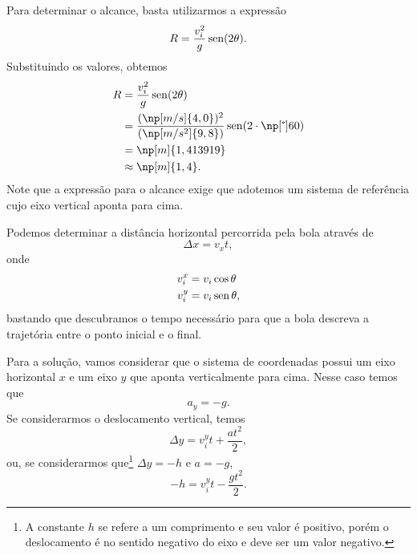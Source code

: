 Para determinar o alcance, basta utilizarmos a expressão
\begin{equation}
    R = \frac{v_i^2}{g} \operatorname{sen}(2\theta).
\end{equation}
%
Substituindo os valores, obtemos
\begin{align}
    R &= \frac{v_i^2}{g} \sen(2\theta) \\
    &= \frac{(\np[m/s]{4,0})^2}{(\np[m/s^2]{9,8})} \sen(2 \cdot \degree{60}) \\
    &= \np[m]{1,413919} \\
    &\approx \np[m]{1,4}.
\end{align}
%
Note que a expressão para o alcance exige que adotemos um sistema de referência cujo eixo vertical aponta para cima.

Podemos determinar a distância horizontal percorrida pela bola através de
\begin{equation}
	\Delta x = v_x t,
\end{equation}
%
onde
\begin{align}
	v_{i}^{x} &= v_i \cos\theta \label{Eq:VelocidadeXExemploLancamentoBola} \\
	v_{i}^{y} &= v_i \operatorname{sen}\theta,
\end{align}
%
bastando que descubramos o tempo necessário para que a bola descreva a trajetória entre o ponto inicial e o final.

Para a solução, vamos considerar que o sistema de coordenadas possui um eixo horizontal $x$ e um eixo $y$ que aponta verticalmente para cima. Nesse caso temos que
\begin{equation}
	a_y = -g.
\end{equation}
%
Se considerarmos o deslocamento vertical, temos
\begin{equation}
	\Delta y = v_{i}^{y}t + \frac{at^2}{2},
\end{equation}
%
ou, se considerarmos que\footnote{A constante $h$ se refere a um comprimento e seu valor é positivo, porém o deslocamento é no sentido negativo do eixo e deve ser um valor negativo.} $\Delta y = -h$ e $a = -g$,
\begin{equation}
	-h = v_{i}^{y} t - \frac{gt^2}{2}.
\end{equation}

